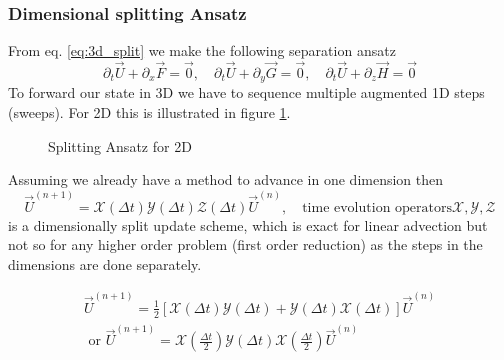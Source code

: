 \subsubsection{Dimensional splitting Ansatz}
From eq. \ref{eq:3d_split} we make the following separation ansatz
\begin{equation}
    \partial_t \vec{U} + \partial_x \vec{F} = \vec{0}, \quad \partial_t \vec{U} + \partial_y \vec{G} = \vec{0}, \quad \partial_t \vec{U} + \partial_z \vec{H} = \vec{0}
\end{equation}
To forward our state in 3D we have to sequence multiple augmented 1D steps (sweeps). For 2D this
is illustrated in figure \ref{fig:2d_sweep}.

\begin{figure}[htb!]
    \centering
    
    \caption{Splitting Ansatz for 2D}
    \label{fig:2d_sweep}
\end{figure}

Assuming we already have a method to advance in one dimension then
\begin{equation}
    \vec{U}^{(n+1)} = \mathcal{X}(\Delta t) \mathcal{Y}(\Delta t) \mathcal{Z}(\Delta t) \vec{U}^{(n)}, \quad \text{time evolution operators} \mathcal{X}, \mathcal{Y}, \mathcal{Z}
\end{equation}
is a dimensionally split update scheme, which is exact for linear advection but
not so for any higher order problem (first order reduction) as the steps
in the dimensions are done separately.

\begin{equation}
    \begin{gathered}
    \vec{U}^{(n+1)}=\frac{1}{2}[\mathcal{X}(\Delta t) \mathcal{Y}(\Delta t)+\mathcal{Y}(\Delta t) \mathcal{X}(\Delta t)] \vec{U}^{(n)} \\
    \text { or } \vec{U}^{(n+1)}=\mathcal{X}\left(\frac{\Delta t}{2}\right) \mathcal{Y}(\Delta t) \mathcal{X}\left(\frac{\Delta t}{2}\right) \vec{U}^{(n)}
    \end{gathered}
\end{equation}

